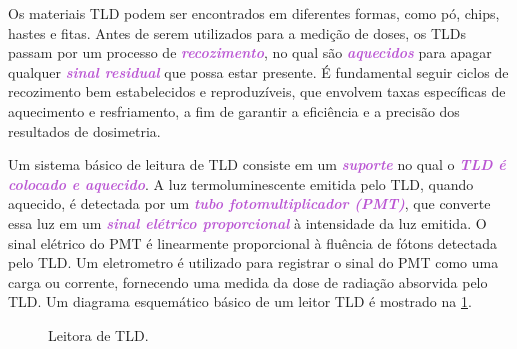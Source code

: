 \documentclass[11pt,a4paper]{article}
\begin{document}
	Os materiais TLD podem ser encontrados em diferentes formas, como pó, chips, hastes e fitas. Antes de serem utilizados para a medição de doses, os TLDs passam por um processo de \textcolor{MediumOrchid}{\textit{\textbf{recozimento}}}, no qual são \textcolor{MediumOrchid}{\textit{\textbf{aquecidos}}} para apagar qualquer \textcolor{MediumOrchid}{\textit{\textbf{sinal residual}}} que possa estar presente. É fundamental seguir ciclos de recozimento bem estabelecidos e reproduzíveis, que envolvem taxas específicas de aquecimento e resfriamento, a fim de garantir a eficiência e a precisão dos resultados de dosimetria.

	Um sistema básico de leitura de TLD consiste em um \textcolor{MediumOrchid}{\textit{\textbf{suporte}}} no qual o \textcolor{MediumOrchid}{\textit{\textbf{TLD é colocado e aquecido}}}. A luz termoluminescente emitida pelo TLD, quando aquecido, é detectada por um \textcolor{MediumOrchid}{\textit{\textbf{tubo fotomultiplicador (PMT)}}}, que converte essa luz em um \textcolor{MediumOrchid}{\textit{\textbf{sinal elétrico proporcional}}} à intensidade da luz emitida. O sinal elétrico do PMT é linearmente proporcional à fluência de fótons detectada pelo TLD. Um eletrometro é utilizado para registrar o sinal do PMT como uma carga ou corrente, fornecendo uma medida da dose de radiação absorvida pelo TLD. Um diagrama esquemático básico de um leitor TLD é mostrado na \ref{fig:leitorTld}.

	\begin{figure}[h]
		\centering
		\caption{Leitora de TLD.}
		\label{fig:leitorTld}
	\end{figure}
\end{document}
